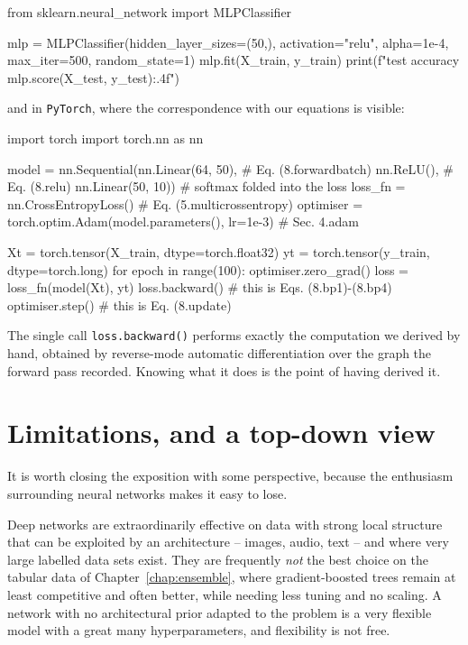 \begin{Python}{}
from sklearn.neural_network import MLPClassifier

mlp = MLPClassifier(hidden_layer_sizes=(50,), activation="relu",
                    alpha=1e-4, max_iter=500, random_state=1)
mlp.fit(X_train, y_train)
print(f"test accuracy {mlp.score(X_test, y_test):.4f}")
\end{Python}

and in \texttt{PyTorch}, where the correspondence with our equations is
visible:

\begin{Python}{}
import torch
import torch.nn as nn

model = nn.Sequential(nn.Linear(64, 50),   # Eq. (8.forwardbatch)
                      nn.ReLU(),           # Eq. (8.relu)
                      nn.Linear(50, 10))   # softmax folded into the loss
loss_fn = nn.CrossEntropyLoss()            # Eq. (5.multicrossentropy)
optimiser = torch.optim.Adam(model.parameters(), lr=1e-3)   # Sec. 4.adam

Xt = torch.tensor(X_train, dtype=torch.float32)
yt = torch.tensor(y_train, dtype=torch.long)
for epoch in range(100):
    optimiser.zero_grad()
    loss = loss_fn(model(Xt), yt)
    loss.backward()                        # this is Eqs. (8.bp1)-(8.bp4)
    optimiser.step()                       # this is Eq. (8.update)
\end{Python}

The single call \texttt{loss.backward()} performs exactly the computation we
derived by hand, obtained by reverse-mode automatic differentiation over the
graph the forward pass recorded.  Knowing what it does is the point of having
derived it.

\section{Limitations, and a top-down view}
\label{sec:nnlimitations}

It is worth closing the exposition with some perspective, because the
enthusiasm surrounding neural networks makes it easy to lose.

Deep networks are extraordinarily effective on data with strong local
structure that can be exploited by an architecture -- images, audio, text --
and where very large labelled data sets exist.  They are frequently \emph{not}
the best choice on the tabular data of Chapter~\ref{chap:ensemble}, where
gradient-boosted trees remain at least competitive and often better, while
needing less tuning and no scaling.  A network with no architectural prior
adapted to the problem is a very flexible model with a great many
hyperparameters, and flexibility is not free.


